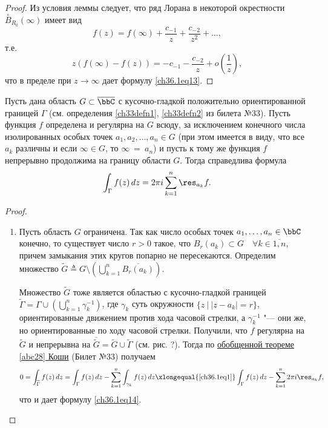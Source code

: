 \begin{proof}
Из условия леммы следует, что ряд Лорана в некоторой окрестности $\overset{\circ}{B}_{R_0}(\infty)$ имеет вид
$$
f(z) = f(\infty) + \frac{c_{-1}}{z} + \frac{c_{-2}}{z^2} + \ldots,
$$
т.е.
$$
z(f(\infty) - f(z)) = -c_{-1} - \frac{c_{-2}}{z} + o\left(\frac{1}{z}\right),
$$
что в пределе при $z \to \infty$ дает формулу \eqref{ch36.1eq13}.	
\end{proof}

\begin{leftbar}
\begin{thm}  \label{ch36.1T1}
Пусть дана область $G \subset \overline{\bbC}$ с кусочно-гладкой положительно ориентированной границей $\Gamma$ (см. определения \ref{ch33defn1}, \ref{ch33defn2} из билета №33). Пусть функция $f$ определена и регулярна на $G$ всюду, за исключением конечного числа изолированных особых точек $a_1,a_2,\ldots,a_n \in G$ (при этом имеется в виду, что все $a_k$ различны и если $\infty \in G$, то $\infty\ =\ a_n$) и пусть к тому же функция $f$ непрерывно продолжима на границу области $G$. Тогда справедлива формула
\begin{equation} \label{ch36.1eq14}
\int_\Gamma f(z) \,dz = 2 \pi i \sum_{k = 1}^{n} \res_{a_k} f.
\end{equation}
\end{thm}

\begin{proof}\leavevmode
\begin{enumerate}[wide, labelwidth=!, labelindent=0pt]
\item Пусть область $G$ ограничена. Так как число особых точек $a_1,\ldots,a_n \in \bbC$ конечно, то существует число $r > 0$ такое, что $B_r(a_k) \subset G \quad \forall k \in \overline{1,n}$, причем замыкания этих кругов попарно не пересекаются. Определим множество $\widetilde{G} \triangleq G \setminus \left( \bigcup\limits_{k = 1}^{n} \overline{B_r(a_k)}\right)$.

Множество $\widetilde{G}$ тоже является областью с кусочно-гладкой границей $\widetilde{\Gamma} = \Gamma \cup \left( \bigcup\limits_{k = 1}^{n} \gamma_{k}^{-1} \right)$,	где $\gamma_k$ суть окружности $\{ z \: \big| \: |z - a_k| = r \}$, ориентированные движением против хода часовой стрелки, а $\gamma_{k}^{-1}$ "--- они же, но ориентированные по ходу часовой стрелки. Получили, что $f$ регулярна на $\widetilde{G}$ и непрерывна на $\overline{\widetilde{G}} = \widetilde{G} \cup \widetilde{\Gamma}$ (см. рис. ?). Тогда по \hyperref[abc28]{обобщенной теореме \ref{abc28} Коши} (Билет №33) получаем
$$
0 = \int_{\widetilde{\Gamma}} f(z) \,dz = \int_{\Gamma} f(z) \,dz - \sum_{k = 1}^{n} \int_{\gamma_k} f(z) \,dz \xlongequal{\eqref{ch36.1eq1}} \int_{\Gamma} f(z) \,dz - \sum_{k = 1}^{n} 2\pi i \res_{a_k} f,
$$
что и дает формулу \eqref{ch36.1eq14}.



\end{enumerate}
\end{proof}
\end{leftbar}
